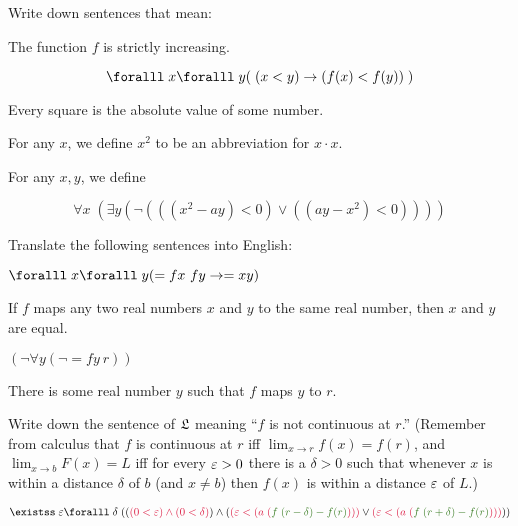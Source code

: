 \begin{problem}
  \step
  \begin{enumalph}
    \item Write down sentences that mean:
      \begin{enumroman}
        \item The function $f$ is strictly increasing.
        \begin{Answer}
          \[ \forall x \forall y (\; (x < y) \lto (f(x) < f(y))\;) \]
        \end{Answer}
        \item Every square is the absolute value of some number.
        \begin{Answer}
          \step
          For any $x$, we define $x^2$ to be an abbreviation for $x \cdot x$.

          \step
          For any $x, y$, we define 

          \[ \forall x \; ( \exists y (\lnot (((x^2 - ay) < 0) \lor ((ay - x^2) < 0)))) \]
        \end{Answer}
      \end{enumroman}
    \item Translate the following sentences into English:
      \begin{enumroman}
        \item $\forall x \forall y (= fx\ fy \lto = x y)$
          \begin{Answer}
            If $f$ maps any two real numbers $x$ and $y$
            to the same real number,
            then $x$ and $y$ are equal.
          \end{Answer}
        \item $(\lnot \forall y (\lnot = fy\ r))$
          \begin{Answer}
            There is some real number $y$ such that $f$ maps $y$ to $r$.
          \end{Answer}
      \end{enumroman}
    \item Write down the sentence of $\mathfrak{L}$ meaning
      ``$f$ is not continuous at $r$.''
      (Remember from calculus that $f$ is continuous at $r$ iff
      $\lim_{x \to r} f(x) = f(r)$, and $\lim_{x \to b} F(x) = L$
      iff for every $\varepsilon > 0$ there is a $\delta > 0$ such that
      whenever $x$ is within a distance $\delta$ of $b$
      (and $x \ne b$) then $f(x)$ is within a distance $\varepsilon$ of $L$.)
      \begin{Answer}
        \[ \exists \eps \forall \delta \; ( (\crim{(0 < \eps) \land (0 < \delta)}) \land (\crim{(\eps < (a\; (\green{f\; (r - \delta) - f(r)})))} \lor \crim{(\eps < (a\; (\green{f\; (r + \delta) - f(r)})))})) \]
      \end{Answer}
  \end{enumalph}
\end{problem}
